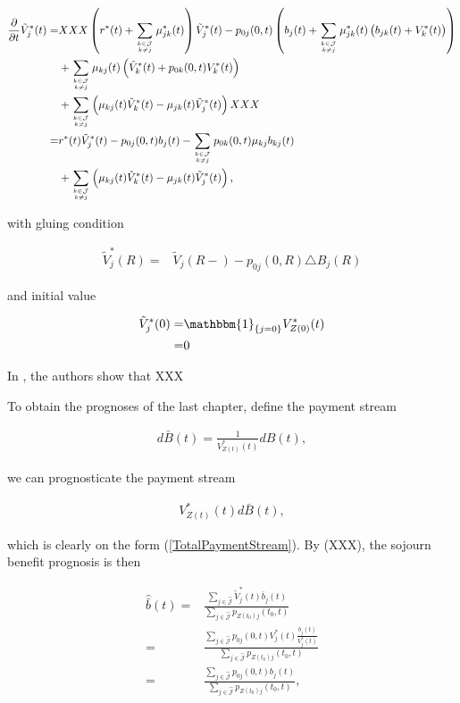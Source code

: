 \documentclass{article}
\newcommand{\1}[1]{\mathbbm{1}_{\left\lbrace #1 \right\rbrace}}
\theoremstyle{break}
\theoremstyle{remark}
\numberwithin{equation}{section}
\begin{document}
\begin{align*}
	\frac{\partial}{\partial t} \tilde{V}_j^*(t) =& XXX\left( r^*(t) + \sum_{k \in \mathcal{J} \atop k \neq j} \mu_{jk}^*(t) \right) \tilde{V}_j^*(t) - p_{0j}(0,t) \left( b_j(t) + \sum_{k \in \mathcal{J} \atop k \neq j} \mu_{jk}^*(t) \left( b_{jk}(t) + V_k^*(t) \right) \right) \\
	&+ \sum_{k \in \mathcal{J} \atop k \neq j} \mu_{kj}(t) \left( \tilde{V}_k^*(t) + p_{0k}(0,t) V_k^*(t) \right) \\
	&+ \sum_{k \in \mathcal{J} \atop k \neq j} \left( \mu_{kj}(t) \tilde{V}_k^*(t) - \mu_{jk}(t) \tilde{V}_j^*(t) \right)XXX \\
	=& r^*(t) \tilde{V}_j^*(t) - p_{0j}(0,t) b_j(t) - \sum_{k \in \mathcal{J} \atop k \neq j} p_{0k}(0,t) \mu_{kj} b_{kj}(t) \\
	&+ \sum_{k \in \mathcal{J} \atop k \neq j} \left( \mu_{kj}(t) \tilde{V}_k^*(t) - \mu_{jk}(t) \tilde{V}_j^*(t) \right),
\end{align*}

with gluing condition

\begin{align*}
	\tilde{V}_j^*(R) =& \tilde{V}_j(R-) - p_{0j}(0,R) \triangle B_j(R)
\end{align*}

and initial value

\begin{align*}
	\tilde{V}_j^*(0) =& \1{j=0} V_{Z(0)}^*(t) \\
	=& 0
\end{align*}

In \cite{Lollike}, the authors show that XXX

To obtain the prognoses of the last chapter, define the payment stream

\begin{align*}
	d\bar{B}(t) = \frac{1}{V_{Z(t)}^*(t)}dB(t),
\end{align*}

we can prognosticate the payment stream

\begin{align*}
	V_{Z(t)}^*(t) d\bar{B}(t),
\end{align*}

which is clearly on the form (\ref{TotalPaymentStream}). By (XXX), the sojourn benefit prognosis is then

\begin{align*}
	\hat{\bar{b}}(t) =& \frac{\sum_{j \in \hat{\mathcal{J}}} \tilde{V}_j^*(t) \bar{b}_j(t)}{\sum_{j \in \hat{\mathcal{J}}} p_{Z(t_0)j}(t_0,t)} \\
	=& \frac{\sum_{j \in \hat{\mathcal{J}}} p_{0j}(0,t) V_j^*(t) \frac{b_j(t)}{V_j^*(t)}}{\sum_{j \in \hat{\mathcal{J}}} p_{Z(t_0)j}(t_0,t)} \\
	=& \frac{\sum_{j \in \hat{\mathcal{J}}} p_{0j}(0,t) b_j(t)}{\sum_{j \in \hat{\mathcal{J}}} p_{Z(t_0)j}(t_0,t)},
\end{align*}
\end{document}
